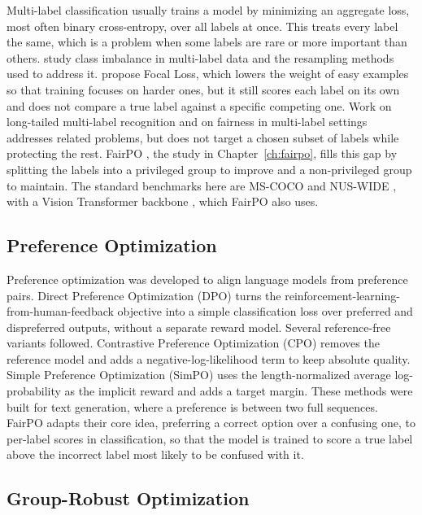 Multi-label classification usually trains a model by minimizing an aggregate loss,
most often binary cross-entropy, over all labels at once. This treats every label
the same, which is a problem when some labels are rare or more important than
others. \citet{charte2015imbalance} study class imbalance in multi-label data and
the resampling methods used to address it. \citet{lin2018focal} propose Focal
Loss, which lowers the weight of easy examples so that training focuses on harder
ones, but it still scores each label on its own and does not compare a true label
against a specific competing one. Work on long-tailed multi-label recognition
\citep{guo2021longtailed} and on fairness in multi-label settings
\citep{liu2023simfair} addresses related problems, but does not target a chosen
subset of labels while protecting the rest. FairPO \citep{mondal2025fairpo}, the
study in Chapter~\ref{ch:fairpo}, fills this gap by splitting the labels into a
privileged group to improve and a non-privileged group to maintain. The standard
benchmarks here are MS-COCO \citep{lin2015coco} and NUS-WIDE
\citep{chua2009nuswide}, with a Vision Transformer backbone
\citep{dosovitskiy2021vit}, which FairPO also uses.

\subsection{Preference Optimization}
\label{sec:rw-fairpo-po}

Preference optimization was developed to align language models from preference
pairs. Direct Preference Optimization (DPO) \citep{rafailov2023direct} turns the
reinforcement-learning-from-human-feedback objective into a simple classification
loss over preferred and dispreferred outputs, without a separate reward model.
Several reference-free variants followed. Contrastive Preference Optimization
(CPO) \citep{xu2024contrastive} removes the reference model and adds a
negative-log-likelihood term to keep absolute quality. Simple Preference
Optimization (SimPO) \citep{meng2024simpo} uses the length-normalized average
log-probability as the implicit reward and adds a target margin. These methods
were built for text generation, where a preference is between two full sequences.
FairPO adapts their core idea, preferring a correct option over a confusing one,
to per-label scores in classification, so that the model is trained to score a
true label above the incorrect label most likely to be confused with it.

\subsection{Group-Robust Optimization}
\label{sec:rw-fairpo-dro}

